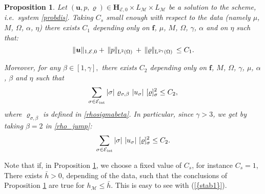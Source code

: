 \documentclass{amsart}
\newtheorem{prop}{Proposition}
\numberwithin{equation}{section}
\begin{document}
\begin{prop}\label{prop:estimates}
Let $({{\boldsymbol u}},p,{\varrho}) \in  {{\mathbf{H}_{{{\mathcal E}},0}}} \times L_{{\mathcal M}} \times L_{{\mathcal M}}$  be a solution to the scheme, {\emph{i.e.\/}}\ system \eqref{probdis}.
Taking $C_s$ small enough with respect to the data (namely $\mu$, ${M}$, $\Omega$, $\alpha$, $\eta$)
there exists  $C_1$  depending only on ${{\boldsymbol f}}$, $\mu$, ${M}$, $\Omega$, $\gamma$, $\alpha$ and on $\eta$  such that:
\begin{equation}\label{ienergie}
\| {{\boldsymbol u}} \|_{1,\operatorname{{\mathcal{E}}},0} +  {\hspace{.2em}|\hspace{-.1em}| {p} |\hspace{-.1em}|_{{{{\rm L}^{2}}(\Omega)}}\hspace{.2em}} + {\hspace{.2em}|\hspace{-.1em}| {\varrho} |\hspace{-.1em}|_{{{{\rm L}}^{2\gamma}(\Omega)}}\hspace{.2em}} \leq C_1.
\end{equation}\label{estimup}

Moreover, for any $\beta \in [1,\gamma],$ there exists $C_2$ depending only on ${{\boldsymbol f}}$, ${M}$, $\Omega$, $\gamma$, $\mu$, $\alpha$, $\beta$ and $\eta$ such that 
\begin{equation}
\sum_{{{\sigma}} \in {{\mathcal E}_{\rm int}}} |{{\sigma}}| \ {\varrho}_{{{\sigma}},\beta}\ |{{u}_{{\sigma}}}|\ [{\varrho}]_{{\sigma}}^2 \leq C_2,
\label{rho_jump}
\end{equation}
where ${\varrho}_{{{\sigma}},\beta}$ is defined in \eqref{rhosigmabeta}.
In particular, since $ \gamma>3$, we get by taking $\beta = 2$ in \eqref{rho_jump}: 
\begin{equation}
\sum_{{{\sigma}} \in {{\mathcal E}_{\rm int}}} |{{\sigma}}|\  |{{u}_{{\sigma}}}|\ [{\varrho}]_{{\sigma}}^2 \leq C_2.
\label{bvweak}\end{equation}
\end{prop}
Note that if, in Proposition \ref{prop:estimates}, we choose a fixed value of $C_s$, for instance $C_s=1$, There exists $\bar h>0$, depending of the data, such that the conclusions of Proposition \ref{prop:estimates} are true for  
$h_{{\mathcal M}} \le \bar h$. This is easy to see with {(\ref{{stab1}})}.
\end{document}

